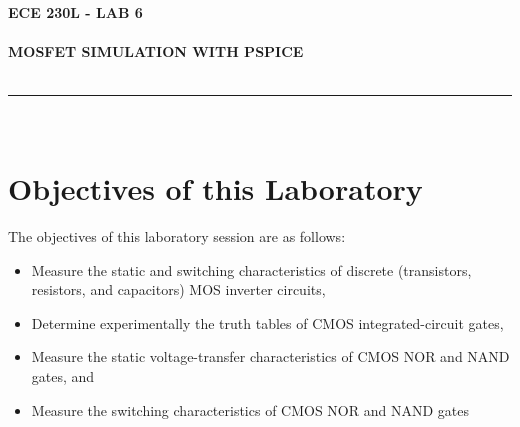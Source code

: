 \documentclass[12pt]{../manual}
\begin{document}
\begin{center}
\textbf{\huge ECE 230L - LAB 6}\\~\\
\textbf{\large MOSFET SIMULATION WITH PSPICE}\\~\\
\rule{6.5in}{0.5mm}\\
\end{center}

\tableofcontents

\listoffigures

\newpage
%
\section{Objectives of this Laboratory}
The objectives of this laboratory session are as follows:
\begin{itemize}
\item Measure the static and switching characteristics of discrete (transistors, resistors, and
capacitors) MOS inverter circuits,
\item Determine experimentally the truth tables of CMOS integrated-circuit gates,
\item Measure the static voltage-transfer characteristics of CMOS NOR and NAND gates,
and
\item Measure the switching characteristics of CMOS NOR and NAND gates
\end{itemize}
\end{document}
